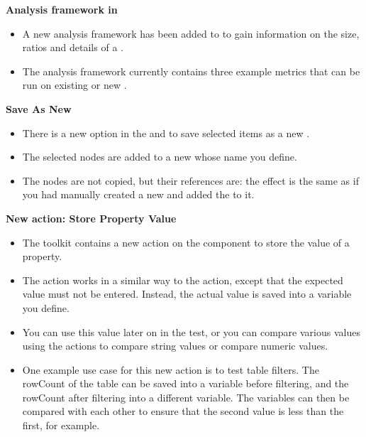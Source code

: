 \textbf{Analysis framework in \app{}}
\begin{itemize}
\item A new analysis framework has been added to \app{} to gain information on the size, ratios and details of a \gdproject{}.
\item The analysis framework currently contains three example metrics that can be run on existing or new \gdprojects{}. 
\end{itemize}

\textbf{Save As New \gdcase{}}
\begin{itemize}
\item There is a new option in the \gdtestcaseeditor{} and \gdtestsuiteeditor{} to save selected items as a new \gdcase{}.
\item The selected nodes are added to a new \gdcase{} whose name you define.
\item The nodes are not copied, but their references are: the effect is the same as if you had manually created a new \gdcase{} and added the \gdcases{} to it. 
\end{itemize}

\textbf{New action: Store Property Value}\\
\begin{itemize}
\item The  toolkit contains a new action on the  component to store the value of a property.
\item The action works in a similar way to the  action, except that the expected value must not be entered. Instead, the actual value is saved into a variable you define.
\item You can use this value later on in the test, or you can compare various values using the actions to compare string values or compare numeric values. 
\item One example use case for this new action is to test table filters. The rowCount of the table can be saved into a variable before filtering, and the rowCount after filtering into a different variable. The variables can then be compared with each other to ensure that the second value is less than the first, for example.
\end{itemize} 

